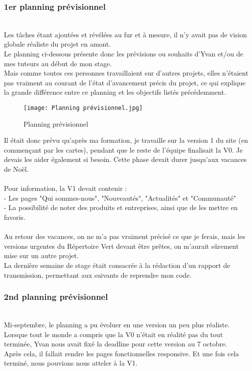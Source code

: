 \subsubsection{1er planning prévisionnel}
~\\

Les tâches étant ajoutées et révélées au fur et à mesure, il n'y avait pas de vision globale réaliste du projet en amont.\\
Le planning ci-dessous présente donc les prévisions ou souhaits d'Yvan et/ou de mes tuteurs au début de mon stage.\\ 
Mais comme toutes ces personnes travaillaient sur d'autres projets, elles n'étaient pas vraiment au courant de l'état d'avancement précis du projet, ce qui explique la grande différence entre ce planning et les objectifs listés précédemment.

\begin{figure}[H]
    \centering
    \texttt{[image: Planning prévisionnel.jpg]}
    \caption{Planning prévisionnel}
\end{figure}

Il était donc prévu qu'après ma formation, je travaille sur la version 1 du site (en commençant par les cartes), 
pendant que le reste de l'équipe finalisait la V0. Je devais les aider également si besoin. Cette phase devait durer jusqu'aux vacances de Noël.
\\\\Pour information, la V1 devait contenir : \\
- Les pages "Qui sommes-nous", "Nouveautés", "Actualités" et "Communauté"\\
- La possibilité de noter des produits et entreprises, ainsi que de les mettre en favoris.
\\\\
Au retour des vacances, on ne m'a pas vraiment précisé ce que je ferais, mais les versions urgentes du Répertoire Vert devant être prêtes, on m'aurait sûrement mise sur un autre projet.
\\
La dernière semaine de stage était consacrée à la rédaction d'un rapport de transmission, permettant aux suivants de reprendre mon code.

\subsubsection{2nd planning prévisionnel}
~\\
Mi-septembre, le planning a pu évoluer en une version un peu plus réaliste.\\
Lorsque tout le monde a compris que la V0 n'était en réalité pas du tout terminée, Yvan nous avait fixé la deadline pour cette version au 7 octobre.
\\Après cela, il fallait rendre les pages fonctionnelles responsive. Et une fois cela terminé, nous pouvions nous atteler à la V1.

